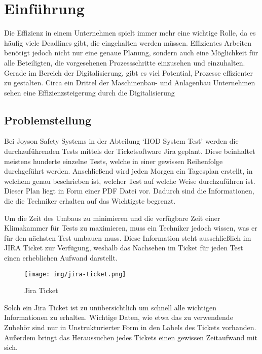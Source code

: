 \section{Einführung}

Die Effizienz in einem Unternehmen spielt immer mehr eine wichtige Rolle, da es häufig viele Deadlines gibt, die 
eingehalten werden müssen. Effizientes Arbeiten benötigt jedoch nicht nur eine genaue Planung, sondern auch eine Möglichkeit für alle Beteiligten,
die vorgesehenen Prozessschritte einzusehen und einzuhalten. Gerade im Bereich der Digitalisierung, gibt es viel Potential, Prozesse 
effizienter zu gestalten. Circa ein Drittel der Maschinenbau- und Anlagenbau Unternehmen sehen eine Effizienzsteigerung durch die 
Digitalisierung~\cite{Bre17}

\subsection{Problemstellung}
Bei Joyson Safety Systems in der Abteilung `\gls{HOD} System Test' werden die 
durchzuführenden Tests mittels der Ticketsoftware Jira geplant. 
Diese beinhaltet meistens hunderte einzelne Tests, welche in einer gewissen
Reihenfolge durchgeführt werden. Anschließend wird jeden Morgen ein Tagesplan 
erstellt, in welchem genau beschrieben ist, welcher Test auf welche Weise 
durchzuführen ist. Dieser Plan liegt in Form einer \gls{PDF} Datei vor. Dadurch sind 
die Informationen, die die \gls{Techniker} erhalten auf das Wichtigste begrenzt. 

Um die Zeit des Umbaus zu minimieren und die verfügbare Zeit einer Klimakammer
für Tests zu maximieren, muss ein \gls{Techniker} jedoch wissen, was er für den 
nächsten Test umbauen muss. Diese Information steht ausschließlich im JIRA 
Ticket zur Verfügung, weshalb das Nachsehen im Ticket für jeden Test einen
erheblichen Aufwand darstellt.

\begin{figure}[H]
    \texttt{[image: img/jira-ticket.png]}
    \caption{Jira Ticket}
\end{figure}

Solch ein Jira Ticket ist zu unübersichtlich um schnell alle wichtigen 
Informationen zu erhalten. Wichtige Daten, wie etwa das zu verwendende Zubehör
sind nur in Unstrukturierter Form in den Labels des Tickets vorhanden. 
Außerdem bringt das Heraussuchen jedes Tickets einen gewissen Zeitaufwand mit sich.\\


